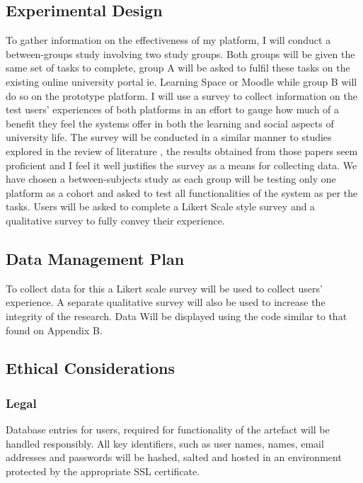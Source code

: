 \documentclass[lettersize,journal]{IEEEtran}
\begin{document}
    	\subsection{Experimental Design}
    	To gather information on the effectiveness of my platform, I will conduct a between-groups study involving
    	two study groups. Both groups will be given the same set of tasks to complete, group A will be asked to fulfil
    	these tasks on the existing online university portal ie. Learning Space or Moodle while group B will
        do so on the prototype platform. I will use a survey to collect information on the test users' experiences
    	of both platforms in an effort to gauge how much of a benefit they feel the systems offer in both the
    	learning and social aspects of university life. The survey will be conducted in a similar manner to
	studies explored in the review of literature \cite{Liu2010}\cite{Baruah2012}\cite{Wang2011}\cite{Evans2014}\cite{Akram et al 2017},
	the results obtained from those papers seem proficient and I feel it well justifies the survey as a means for collecting data.
	We have chosen a between-subjects study	as each group will be testing only one platform as a cohort and asked to test all functionalities of
    	the system as per the tasks. Users will be asked to complete a Likert Scale style survey and a qualitative survey to 
	fully convey their experience.

	\subsection{Data Management Plan}
	To collect data for this a Likert scale survey will be used to collect users' experience.
	A separate qualitative survey will also be used to increase the integrity of the research.
	Data Will be displayed using the code similar to that found on Appendix B.
	\subsection{Ethical Considerations}
	\subsubsection{Legal}
	Database entries for users, required for functionality of the artefact will be
	handled responsibly. All key identifiers, such as user names, names, email
	addresses and passwords will be hashed, salted and hosted in an environment
	protected by the appropriate SSL certificate.
	
\end{document}
